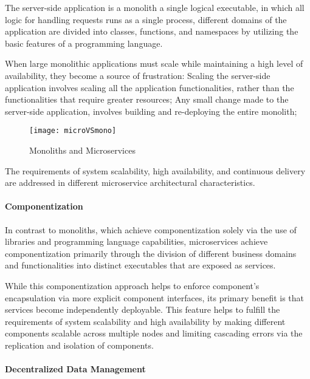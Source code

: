 The server-side application is a monolith a single logical executable, in which all logic for handling requests runs as a single process,
different domains of the application are divided into classes, functions, and namespaces by utilizing the basic features of a programming language.

When large monolithic applications must scale while maintaining a high level of availability, they become a source of frustration:
Scaling the server-side application involves scaling all the application functionalities, rather than the functionalities that require greater resources;
Any small change made to the server-side application, involves building and re-deploying the entire monolith;

\begin{figure}[htbp]
    \centering
    \texttt{[image: microVSmono]}
    \caption{Monoliths and Microservices \cite{microservices}}
    \label{fig:monoliths and microservices}
\end{figure}

The requirements of system scalability, high availability, and continuous delivery are addressed in different microservice architectural characteristics.

\paragraph{Componentization}

In contrast to monoliths, which achieve componentization solely via the use of libraries and programming language capabilities,
microservices achieve componentization primarily through the division of different business domains and functionalities into distinct executables
that are exposed as services.

While this componentization approach helps to enforce component's encapsulation via more explicit component interfaces,
its primary benefit is that services become independently deployable.
This feature helps to fulfill the requirements of system scalability and high availability by
making different components scalable across multiple nodes and limiting cascading errors via the replication and isolation of components.

\paragraph{Decentralized Data Management}

